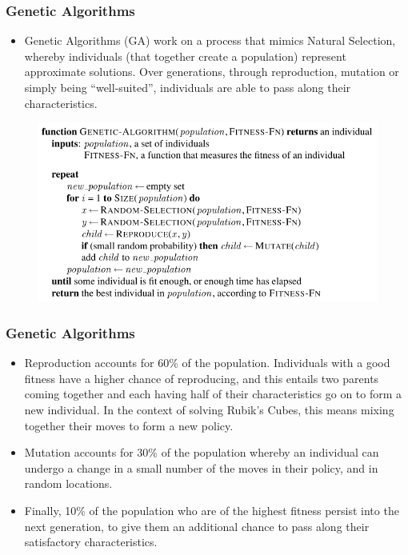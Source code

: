\documentclass[UKenglish]{beamer}
\begin{document}
\begin{frame}
  \frametitle{Genetic Algorithms}
  \begin{itemize}
  \item Genetic Algorithms (GA) work on a process that mimics Natural Selection, whereby individuals (that together create a population) represent approximate solutions. Over generations, through reproduction, mutation or simply being ``well-suited'', individuals are able to pass along their characteristics.
  \end{itemize}

  \begin{figure}
    \centering
    \includegraphics[width=0.75\linewidth]{genetic-algorithm}
  \end{figure}
\end{frame}

\begin{frame}
  \frametitle{Genetic Algorithms}
  \begin{itemize}
  \item Reproduction accounts for 60\% of the population. Individuals with a good fitness have a higher chance of reproducing, and this entails two parents coming together and each having half of their characteristics go on to form a new individual. In the context of solving Rubik's Cubes, this means mixing together their moves to form a new policy.
  \item Mutation accounts for 30\% of the population whereby an individual can undergo a change in a small number of the moves in their policy, and in random locations.
  \item Finally, 10\% of the population who are of the highest fitness persist into the next generation, to give them an additional chance to pass along their satisfactory characteristics.
  \end{itemize}
\end{frame}
\end{document}
